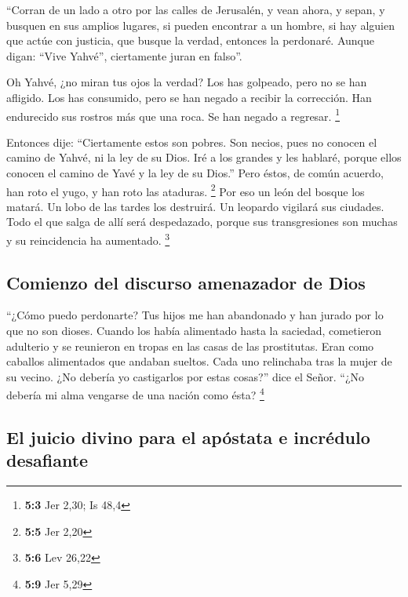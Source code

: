 \begin{paracol}{2}
 ``Corran de un lado a otro por las calles de Jerusalén, y
vean ahora, y sepan, y busquen en sus amplios lugares, si pueden
encontrar a un hombre, si hay alguien que actúe con justicia, que busque
la verdad, entonces la perdonaré.  Aunque digan: ``Vive
Yahvé'', ciertamente juran en falso''.

 Oh Yahvé, ¿no miran tus ojos la verdad? Los has golpeado,
pero no se han afligido. Los has consumido, pero se han negado a recibir
la corrección. Han endurecido sus rostros más que una roca. Se han
negado a regresar. \footnote{\textbf{5:3} Jer 2,30; Is 48,4}

 Entonces dije: ``Ciertamente estos son pobres. Son
necios, pues no conocen el camino de Yahvé, ni la ley de su Dios.
 Iré a los grandes y les hablaré, porque ellos conocen el
camino de Yavé y la ley de su Dios.'' Pero éstos, de común acuerdo, han
roto el yugo, y han roto las ataduras. \footnote{\textbf{5:5} Jer 2,20}
 Por eso un león del bosque los matará. Un lobo de las
tardes los destruirá. Un leopardo vigilará sus ciudades. Todo el que
salga de allí será despedazado, porque sus transgresiones son muchas y
su reincidencia ha aumentado. \footnote{\textbf{5:6} Lev 26,22}

\hypertarget{comienzo-del-discurso-amenazador-de-dios}{%
\subsection{Comienzo del discurso amenazador de
Dios}\label{comienzo-del-discurso-amenazador-de-dios}}

 ``¿Cómo puedo perdonarte? Tus hijos me han abandonado y
han jurado por lo que no son dioses. Cuando los había alimentado hasta
la saciedad, cometieron adulterio y se reunieron en tropas en las casas
de las prostitutas.  Eran como caballos alimentados que
andaban sueltos. Cada uno relinchaba tras la mujer de su vecino.
 ¿No debería yo castigarlos por estas cosas?'' dice el
Señor. ``¿No debería mi alma vengarse de una nación como ésta?
\footnote{\textbf{5:9} Jer 5,29}

\hypertarget{el-juicio-divino-para-el-apuxf3stata-e-incruxe9dulo-desafiante}{%
\subsection{El juicio divino para el apóstata e incrédulo
desafiante}\label{el-juicio-divino-para-el-apuxf3stata-e-incruxe9dulo-desafiante}}


\end{paracol}
